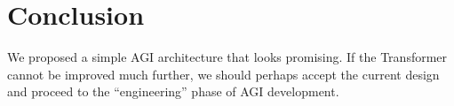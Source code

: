 \documentclass[runningheads]{llncs}
\begin{document}


\section*{Conclusion}

We proposed a simple AGI architecture that looks promising.  If the Transformer cannot be improved much further, we should perhaps accept the current design and proceed to the ``engineering'' phase of AGI development.

\printbibliography
\end{document}
